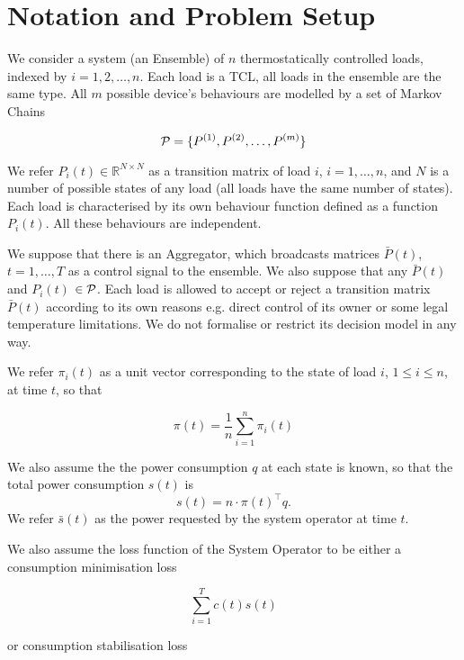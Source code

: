 \section{Notation and Problem Setup} We consider a system (an Ensemble) of $n$ thermostatically controlled loads, indexed by $i = 1, 2, \dots, n$. Each load is a TCL, all loads in the ensemble are the same type. All $m$ possible device's behaviours are modelled by a set of Markov Chains 

\begin{equation}
\label{eq:possible_matrices}
\operatorname{\mathcal{P}} = \{P^{(1)}, P^{(2)}, \dots, P^{(m)}\}    
\end{equation}

 We refer $P_i(t) \in \mathbb{R}^{N\times N}$ as a transition matrix of load $i$, $i = 1, \dots, n$, and $N$ is a number of possible states of any load (all loads have the same number of states). Each load is characterised by its own behaviour function defined as a function $P_i(t)$. All these behaviours are independent.
 
We suppose that there is an Aggregator, which broadcasts matrices ${\bar P}(t)$, $t=1, \dots, T$ as a control signal to the ensemble. We also suppose that any ${\bar P}(t)$ and $P_{i}(t)$  $\in {\cal P}$. Each load is allowed to accept or reject a transition matrix ${\bar P}(t)$ according to its own reasons e.g. direct control of its owner or some legal temperature limitations. We do not formalise or restrict its decision model in any way.

We refer $\pi_i(t)$ as a unit vector corresponding to the state of load $i$, $1\le i \le n$, at time $t$, so that  

\begin{equation}
    \label{eq:pi_definition}
    \pi(t) = \frac{1}{n}\sum_{i=1}^n \pi_i(t)
\end{equation}

We also assume the the power consumption $q$ at each state is known, so that the total power consumption $s(t)$ is 
\[s(t) = n\cdot \pi(t)^\top q.\]
We refer ${\bar s}(t)$ as the power requested by the system operator at time $t$. 

We also assume the loss function of the System Operator to be either a consumption minimisation loss

\begin{equation}
\label{eq:consumption_minimisation_loss}
\sum_{i=1}^T c(t) s(t)  
\end{equation}

or consumption stabilisation loss

